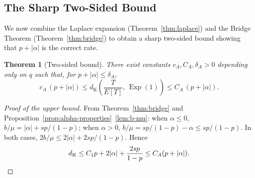 \documentclass[11pt]{article}
\theoremstyle{plain}
\newtheorem{theorem}{Theorem}[section]
\theoremstyle{definition}
\theoremstyle{remark}
\DeclareMathOperator{\Exp}{Exp}
\newcommand{\dK}{d_{\mathrm{K}}}
\begin{document}

\subsection{The Sharp Two-Sided Bound}\label{sec:two-sided}

We now combine the Laplace expansion (Theorem~\ref{thm:laplace}) and the Bridge Theorem (Theorem~\ref{thm:bridge}) to obtain a sharp two-sided bound showing that $p + |\alpha|$ is the correct rate.

\begin{theorem}[Two-sided bound]\label{thm:two-sided}
There exist constants $c_A, C_A, \delta_A > 0$ depending only on $q$ such that, for $p + |\alpha| \leq \delta_A$,
\begin{equation}\label{eq:two-sided}
  c_A\,(p + |\alpha|) \leq \dK\!\left(\frac{T}{E[T]},\, \Exp(1)\right) \leq C_A\,(p + |\alpha|).
\end{equation}
\end{theorem}

\begin{proof}[Proof of the upper bound]
From Theorem~\ref{thm:bridge} and Proposition~\ref{prop:alpha-properties}~\eqref{lem:b-mu}: when $\alpha \leq 0$, $b/\mu = |\alpha| + sp/(1-p)$; when $\alpha > 0$, $b/\mu = sp/(1-p) - \alpha \leq sp/(1-p)$.  In both cases, $2b/\mu \leq 2|\alpha| + 2sp/(1-p)$.  Hence
\[
  \dK \leq C_1 p + 2|\alpha| + \frac{2sp}{1-p} \leq C_A(p + |\alpha|). \qedhere
\]
\end{proof}
\end{document}
